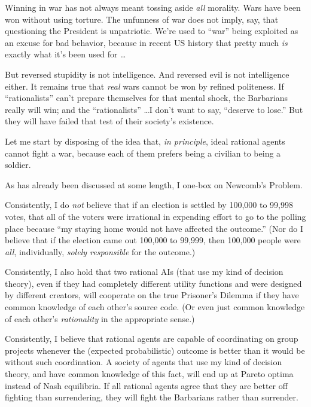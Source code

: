 {
 Winning in war has not always meant tossing aside \textit{all}
morality. Wars have been won without using torture. The unfunness of
war does not imply, say, that questioning the President is unpatriotic.
We're used to
``war'' being exploited as an excuse
for bad behavior, because in recent US history that pretty much
\textit{is} exactly what it's been used for \ldots}

{
 But reversed stupidity is not intelligence. And reversed evil is
not intelligence either. It remains true that \textit{real} wars cannot
be won by refined politeness. If
``rationalists''
can't prepare themselves for that mental shock, the
Barbarians really will win; and the
``rationalists'' \ldots I
don't want to say, ``deserve to
lose.'' But they will have failed that test of their
society's existence.}

{
 Let me start by disposing of the idea that, \textit{in principle},
ideal rational agents cannot fight a war, because each of them prefers
being a civilian to being a soldier.}

{
 As has already been discussed at some length, I one-box on
Newcomb's Problem.}

{
 Consistently, I do \textit{not} believe that if an election is
settled by 100,000 to 99,998 votes, that all of the voters were
irrational in expending effort to go to the polling place because
``my staying home would not have affected the
outcome.'' (Nor do I believe that if the election
came out 100,000 to 99,999, then 100,000 people were \textit{all},
individually, \textit{solely responsible} for the outcome.)}

{
 Consistently, I also hold that two rational AIs (that use my kind
of decision theory), even if they had completely different utility
functions and were designed by different creators, will cooperate on
the true Prisoner's Dilemma if they have common
knowledge of each other's source code. (Or even just
common knowledge of each other's \textit{rationality}
in the appropriate sense.)}

{
 Consistently, I believe that rational agents are capable of
coordinating on group projects whenever the (expected probabilistic)
outcome is better than it would be without such coordination. A society
of agents that use my kind of decision theory, and have common
knowledge of this fact, will end up at Pareto optima instead of Nash
equilibria. If all rational agents agree that they are better off
fighting than surrendering, they will fight the Barbarians rather than
surrender.}

